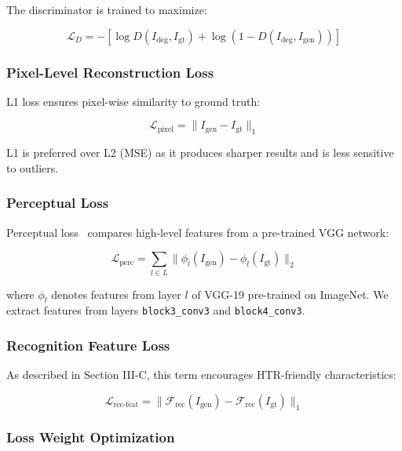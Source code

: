 \documentclass[journal]{IEEEtran}
\begin{document}
The discriminator is trained to maximize:

\begin{equation}
\mathcal{L}_D = -[\log D(I_{\text{deg}}, I_{\text{gt}}) + \log(1 - D(I_{\text{deg}}, I_{\text{gen}}))]
\end{equation}

\subsubsection{Pixel-Level Reconstruction Loss}

L1 loss ensures pixel-wise similarity to ground truth:

\begin{equation}
\mathcal{L}_{\text{pixel}} = \|I_{\text{gen}} - I_{\text{gt}}\|_1
\end{equation}

L1 is preferred over L2 (MSE) as it produces sharper results and is less sensitive to outliers.

\subsubsection{Perceptual Loss}

Perceptual loss~\cite{johnson2016perceptual} compares high-level features from a pre-trained VGG network:

\begin{equation}
\mathcal{L}_{\text{perc}} = \sum_{l \in L} \|\phi_l(I_{\text{gen}}) - \phi_l(I_{\text{gt}})\|_2
\end{equation}

where $\phi_l$ denotes features from layer $l$ of VGG-19 pre-trained on ImageNet. We extract features from layers \texttt{block3\_conv3} and \texttt{block4\_conv3}.

\subsubsection{Recognition Feature Loss}

As described in Section III-C, this term encourages HTR-friendly characteristics:

\begin{equation}
\mathcal{L}_{\text{rec-feat}} = \|\mathcal{F}_{\text{rec}}(I_{\text{gen}}) - \mathcal{F}_{\text{rec}}(I_{\text{gt}})\|_1
\end{equation}

\subsubsection{Loss Weight Optimization}
\end{document}
